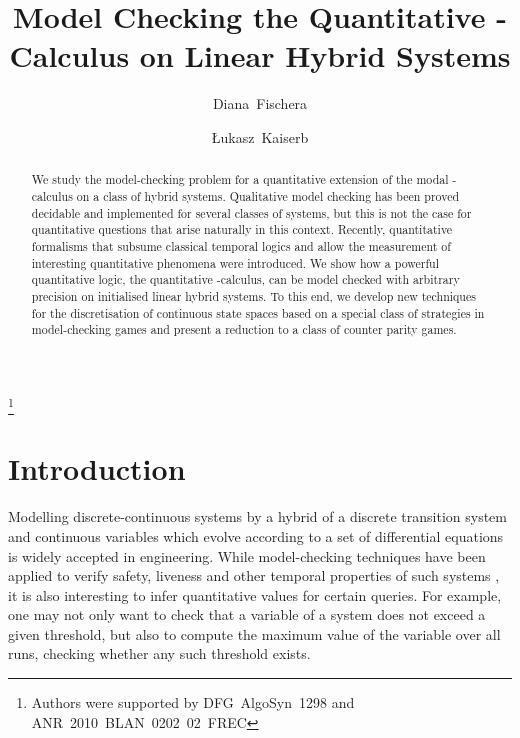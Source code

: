\documentclass[fleqn,envcountsame]{LMCS}
\begin{document}
\title[Model Checking the Quantitative -Calculus on
  Linear Hybrid Systems]{Model Checking the Quantitative -Calculus on
  Linear Hybrid Systems}
\author[D.~Fischer]{Diana~Fischer\rsuper a}
\address{{\lsuper a}Mathematische Grundlagen der Informatik, RWTH Aachen University}

\author[\L.~~Kaiser]{\L{}ukasz~Kaiser\rsuper b}
\address{{\lsuper b}LIAFA, CNRS \& Universit{\'e} Paris Diderot -- Paris 7}

\thanks{Authors were supported by DFG~AlgoSyn~1298 and
  ANR~2010~BLAN~0202~02~FREC}


\begin{abstract}
We study the model-checking problem for a quantitative
extension of the modal -calculus on a class of hybrid systems.
Qualitative model checking has been proved decidable and implemented for
several classes of systems, but this is not the case for quantitative
questions that arise naturally in this context. Recently, quantitative
formalisms that subsume classical temporal logics and allow
the measurement of interesting quantitative phenomena were introduced.
We show how a powerful quantitative logic, the quantitative -calculus, can
be model checked with arbitrary precision on initialised linear hybrid systems.
To this end, we develop new techniques for the discretisation of continuous
state spaces based on a special class of strategies in model-checking games
and present a reduction to a class of counter parity games.
\end{abstract}

\maketitle

\section{Introduction}

Modelling discrete-continuous systems by a hybrid of a discrete transition
system and continuous variables which evolve according to a set of
differential equations is widely accepted in engineering.
While model-checking techniques have been applied to verify safety, liveness
and other temporal properties of such systems \cite{ACHHHNOSY95,HHM99,HKPV95},
it is also interesting to infer quantitative values for certain queries.
For example, one may not only want to check that a variable of a system
does not exceed a given threshold, but also to compute the maximum value
of the variable over all runs, checking whether any such threshold exists.
\end{document}
